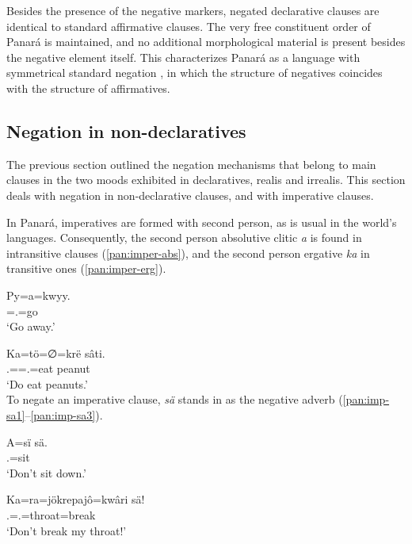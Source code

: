 \documentclass[output=paper,colorlinks,citecolor=brown,draft]{langscibook}
\begin{document}
Besides the presence of the negative markers, negated declarative clauses are identical to standard affirmative clauses. The very free constituent order of Panará is maintained, and no additional morphological material is present besides the negative element itself. This characterizes Panará as a language with symmetrical standard negation \citep{Miestamo2005}, in which the structure of negatives coincides with the structure of affirmatives.

\subsection{Negation in non-declaratives}\label{pan:sec:non-decl}

The previous section outlined the negation mechanisms that belong to main clauses in the two moods exhibited in declaratives, realis and irrealis. This section deals with negation in non-declarative clauses, and with imperative clauses.

In Panará, imperatives are formed with second person, as is usual in the world's languages. Consequently, the second person absolutive clitic \textit{a} is found in intransitive clauses (\ref{pan:imper-abs}), and the second person ergative \textit{ka} in transitive ones (\ref{pan:imper-erg}). 

\ea\label{pan:imper-abs}
    \gll Py=a=kwyy.\\
    \Dir{}=\Ssg.\Abs{}=go\\
    \glt  `Go away.' \\
\z

\ea\label{pan:imper-erg}
    \gll Ka=tö=∅=krë sâti.\\
    \Ssg.\Erg{}=\Ints{}=\Tsg.\Abs{}=eat peanut\\
    \glt  `Do eat peanuts.' \\
\z
To negate an imperative clause, \textit{sä} stands in as the negative adverb (\ref{pan:imp-sa1}--\ref{pan:imp-sa3}). 

\ea\label{pan:imp-sa1}
    \gll A=sï sä. \\
    \Ssg.\Abs{}=sit \Neg{} \\
    \glt `Don't sit down.' \\
\z

\ea\label{pan:imp-sa2}
    \gll Ka=ra=jökrepajô=kwâri sä! \\
    \Ssg.\Erg{}=\Fsg.\Abs{}=throat=break \Neg{} \\
    \glt `Don't break my throat!' \\
\z
\end{document}
